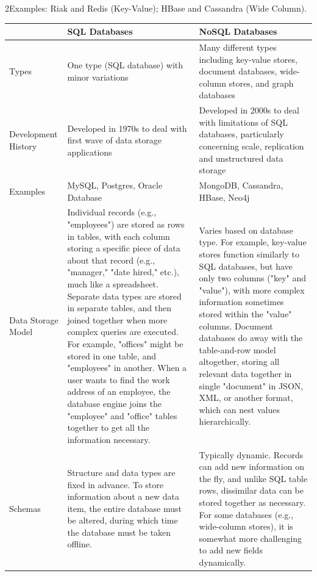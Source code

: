 2Examples: Riak and Redis (Key-Value); HBase and
Cassandra (Wide Column).



\begin{table}[h!]
    \tiny
   
\begin{tabular}{ |L{0.1\paperwidth}|L{0.3\paperwidth}|L{0.3\paperwidth}|}
\hline
	&
	SQL Databases &
	NoSQL Databases
 
\\ \hline
	Types&
	One type (SQL database) with minor variations&
	Many different types including key-value stores, document databases, wide-column stores, and graph databases
	
\\ \hline
	Development History&
	Developed in 1970s to deal with first wave of data storage applications&
	Developed in 2000s to deal with limitations of SQL databases, particularly concerning scale, replication and unstructured data storage
	
\\ \hline
	Examples&
	MySQL, Postgres, Oracle Database&
	MongoDB, Cassandra, HBase, Neo4j
\\ \hline
	Data Storage Model&
	Individual records (e.g., "employees") are stored as rows in tables, with each column storing a specific piece of data about that record (e.g., "manager," "date hired," etc.), much like a spreadsheet. Separate data types are stored in separate tables, and then joined together when more complex queries are executed. For example, "offices" might be stored in one table, and "employees" in another. When a user wants to find the work address of an employee, the database engine joins the "employee" and "office" tables together to get all the information necessary.&
	Varies based on database type. For example, key-value stores function similarly to SQL databases, but have only two columns ("key" and "value"), with more complex information sometimes stored within the "value" columns. Document databases do away with the table-and-row model altogether, storing all relevant data together in single "document" in JSON, XML, or another format, which can nest values hierarchically.
	

\\ \hline
	Schemas&
	Structure and data types are fixed in advance. To store information about a new data item, the entire database must be altered, during which time the database must be taken offline.&
	Typically dynamic. Records can add new information on the fly, and unlike SQL table rows, dissimilar data can be stored together as necessary. For some databases (e.g., wide-column stores), it is somewhat more challenging to add new fields dynamically.


\end{tabular}
\end{table}
